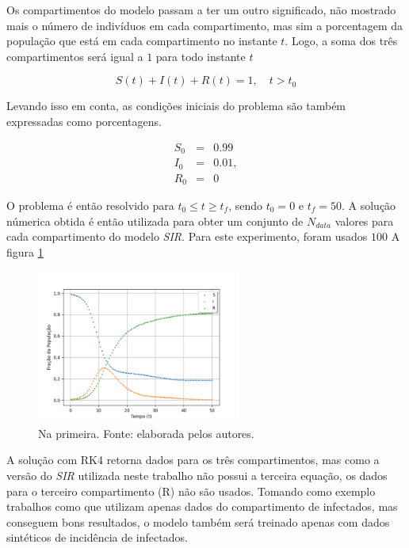 Os compartimentos do modelo passam a ter um outro significado, não mostrado
mais o número de indivíduos em cada compartimento, mas sim a porcentagem 
da população que está em cada compartimento no instante $t$. 
Logo, a soma dos três compartimentos será igual a $1$ para todo instante $t$

\begin{equation}
    S(t) + I(t) + R(t) = 1, \quad t > t_0
\end{equation}

Levando isso em conta, as condições iniciais do problema são também expressadas
como porcentagens.

\begin{eqnarray}
   S_0 &=& 0.99 \label{eq:S0}\\
   I_0 &=& 0.01, \label{eq:I0}\\
   R_0 &=& 0 \label{eq:R0}
\end{eqnarray}

O problema é então resolvido para $t_0 \le t \ge t_f$, sendo $t_0=0$ e $t_f=50$.
A solução númerica obtida é então utilizada para obter um conjunto de 
$N_{data}$ valores para cada compartimento do modelo \textit{SIR}. 
Para este experimento, foram usados $100$ A figura \ref{fig:dados-semruido} 

\begin{figure}[htpb]
\centering
\includegraphics[width=0.6\textwidth]{figuras/runge-kutta-compartiments-data-sir-nonoise.png}
\caption{Na primeira. Fonte: elaborada pelos autores.}
\label{fig:dados-semruido}
\end{figure}

A solução com RK4 retorna dados para os três compartimentos, mas como a versão
do \textit{SIR} utilizada neste trabalho não possui a terceira equação, os 
dados para o terceiro compartimento (R) não são usados. Tomando como exemplo
trabalhos como \cite{han-etal:24-prim-artigo-alemanha} que utilizam apenas
dados do compartimento de infectados, mas conseguem bons resultados, o modelo
também será treinado apenas com dados sintéticos de incidência de infectados.  

